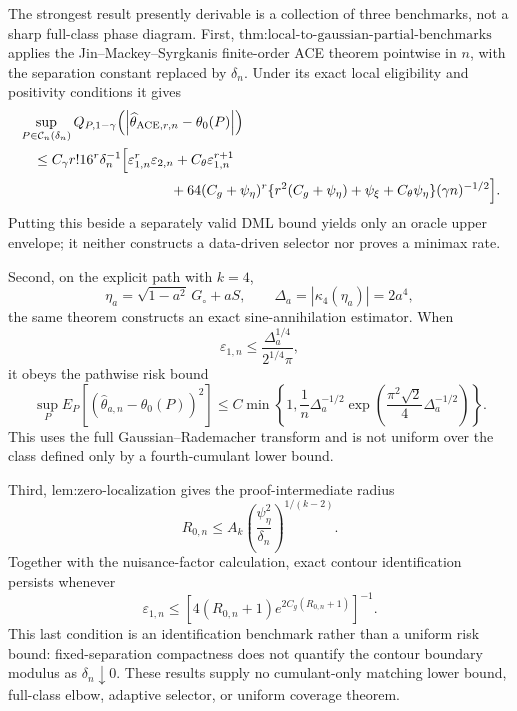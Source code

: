 The strongest result presently derivable is a collection of three
benchmarks, not a sharp full-class phase diagram.  First,
\(\text{thm:local-to-gaussian-partial-benchmarks}\) applies the
Jin--Mackey--Syrgkanis finite-order ACE theorem pointwise in \(n\), with
the separation constant replaced by \(\delta_n\).  Under its exact local
eligibility and positivity conditions it gives
\[
\begin{aligned}
 &\sup_{P\in\mathcal C_n(\delta_n)}
 Q_{P,1-\gamma}
 \!\left(\left|\widehat\theta_{\mathrm{ACE},r,n}-\theta_0(P)\right|\right)\\
 &\quad\le
 C_{\gamma}r!16^r\delta_n^{-1}
 \Bigl[
   \varepsilon_{1,n}^r\varepsilon_{2,n}
   +C_{\theta}\varepsilon_{1,n}^{r+1}\\
 &\hspace{38mm}
   +64(C_g+\psi_{\eta})^r
    \{r^2(C_g+\psi_{\eta})+\psi_{\xi}+C_{\theta}\psi_{\eta}\}
    (\gamma n)^{-1/2}
 \Bigr].
\end{aligned}
\]
Putting this beside a separately valid DML bound yields only an oracle
upper envelope; it neither constructs a data-driven selector nor proves a
minimax rate.

Second, on the explicit path with \(k=4\),
\[
 \eta_a=\sqrt{1-a^2}\,G_{\circ}+aS,
 \qquad
 \Delta_a=|\kappa_4(\eta_a)|=2a^4,
\]
the same theorem constructs an exact sine-annihilation estimator.  When
\[
 \varepsilon_{1,n}
 \le \frac{\Delta_a^{1/4}}{2^{1/4}\pi},
\]
it obeys the pathwise risk bound
\[
 \sup_P E_P\!\left[(\widehat\theta_{a,n}-\theta_0(P))^2\right]
 \le
 C\min\!\left\{
  1,\frac1n\Delta_a^{-1/2}
  \exp\!\left(
    \frac{\pi^2\sqrt2}{4}\Delta_a^{-1/2}
  \right)
 \right\}.
\]
This uses the full Gaussian--Rademacher transform and is not uniform over
the class defined only by a fourth-cumulant lower bound.

Third, \(\text{lem:zero-localization}\) gives the proof-intermediate
radius
\[
 R_{0,n}
 \le A_k\left(\frac{\psi_{\eta}^2}{\delta_n}\right)^{1/(k-2)}.
\]
Together with the nuisance-factor calculation, exact contour
identification persists whenever
\[
 \varepsilon_{1,n}
 \le
 \left[4(R_{0,n}+1)e^{2C_g(R_{0,n}+1)}\right]^{-1}.
\]
This last condition is an identification benchmark rather than a uniform
risk bound: fixed-separation compactness does not quantify the contour
boundary modulus as \(\delta_n\downarrow0\).  These results supply no
cumulant-only matching lower bound, full-class elbow, adaptive selector,
or uniform coverage theorem.
